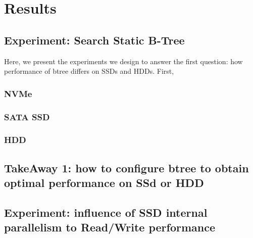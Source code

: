 
\section{Results}

\subsection{Experiment: Search Static B-Tree}
Here, we present the experiments we design to answer the first question: how performance of btree differs on SSDs and HDDs. First, 

\subsubsection{NVMe}

\subsubsection{SATA SSD}

\subsubsection{HDD}

\subsection{TakeAway 1: how to configure btree to obtain optimal performance on SSd or HDD}



\subsection{Experiment: influence of SSD internal parallelism to Read/Write performance}

